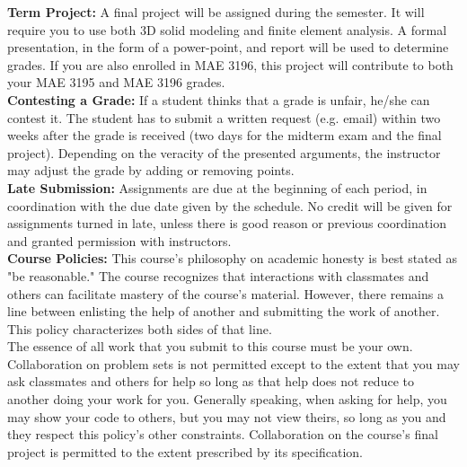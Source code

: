 \documentclass[11pt]{article}
\begin{document}
\textbf{\large Term Project:}
A final project will be assigned during the semester. It will require you to use both 3D solid modeling and finite element analysis. A formal presentation, in the form of a power-point, and report will be used to determine grades. If you are also enrolled in MAE 3196, this project will contribute to both your MAE 3195 and MAE 3196 grades. \\
 
\textbf{\large Contesting a Grade:}
If a student thinks that a grade is unfair, he/she can contest it. The student has to submit a written request (e.g. email) within two weeks after the grade is received (two days for the midterm exam and the final project). Depending on the veracity of the presented arguments, the instructor may adjust the grade by adding or removing points. \\

\textbf{\large Late Submission:}
Assignments are due at the beginning of each period, in coordination with the due date given by the schedule. No credit will be given for assignments turned in late, unless there is good reason or previous coordination and granted permission with instructors.\\

\textbf {\large Course Policies:}
This course’s philosophy on academic honesty is best stated as "be reasonable." The course recognizes that interactions with classmates and others can facilitate mastery of the course’s material. However, there remains a line between enlisting the help of another and submitting the work of another. This policy characterizes both sides of that line.\\

The essence of all work that you submit to this course must be your own. Collaboration on problem sets is not permitted except to the extent that you may ask classmates and others for help so long as that help does not reduce to another doing your work for you. Generally speaking, when asking for help, you may show your code to others, but you may not view theirs, so long as you and they respect this policy’s other constraints. Collaboration on the course’s final project is permitted to the extent prescribed by its specification.\\
\end{document}
